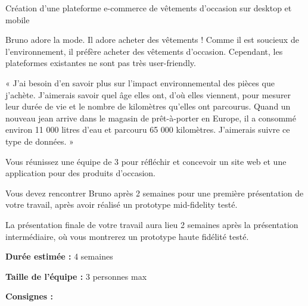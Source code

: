 \makeheaderfiles

Création d'une plateforme e-commerce de vêtements d'occasion sur desktop et mobile

Bruno adore la mode. Il adore acheter des vêtements ! Comme il est soucieux de l'environnement, il préfère acheter des vêtements d'occasion. Cependant, les plateformes existantes ne sont pas très user-friendly.

« J'ai besoin d'en savoir plus sur l'impact environnemental des pièces que j'achète. J'aimerais savoir quel âge elles ont, d'où elles viennent, pour mesurer leur durée de vie et le nombre de kilomètres qu'elles ont parcourus. Quand un nouveau jean arrive dans le magasin de prêt-à-porter en Europe, il a consommé environ 11 000 litres d'eau et parcouru 65 000 kilomètres. J'aimerais suivre ce type de données. »

Vous réunissez une équipe de 3 pour réfléchir et concevoir un site web et une application pour des produits d'occasion.

Vous devez rencontrer Bruno après 2 semaines pour une première présentation de votre travail, après avoir réalisé un prototype mid-fidelity testé.

La présentation finale de votre travail aura lieu 2 semaines après la présentation intermédiaire, où vous montrerez un prototype haute fidélité testé.

\textbf{Durée estimée :} 4 semaines

\textbf{Taille de l'équipe :} 3 personnes max

\textbf{Consignes :}

